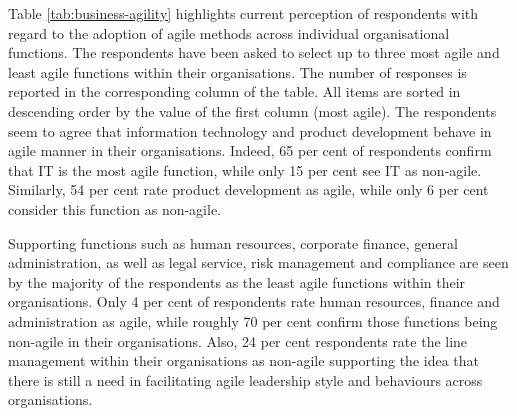 \documentclass{article}
\begin{document}
Table \ref{tab:business-agility} highlights current perception of respondents with regard to the adoption of agile methods across individual organisational functions.
The respondents have been asked to select up to three most agile and least agile functions within their organisations. The number of responses is reported in the corresponding column of the table. All items are sorted in descending order by the value of the first column (most agile). The respondents seem to agree that information technology and product development behave in agile manner in their organisations. Indeed, 65 per cent of respondents confirm that IT is the most agile function, while only 15 per cent see IT as non-agile. Similarly, 54 per cent rate product development as agile, while only 6 per cent consider this function as non-agile.

Supporting functions such as human resources, corporate finance, general administration, as well as legal service, risk management and compliance are seen by the majority of the respondents as the least agile functions within their organisations. Only 4 per cent of respondents rate human resources, finance and administration as agile, while roughly 70 per cent confirm those functions being non-agile in their organisations.
Also, 24 per cent respondents rate the line management within their organisations as non-agile supporting the idea that there is still a need in facilitating agile leadership style and behaviours across organisations.
\end{document}

